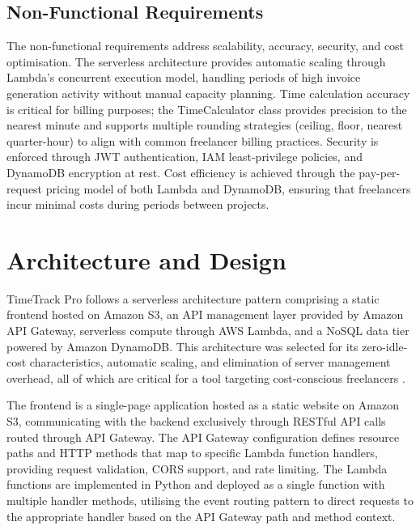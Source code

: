 \documentclass[conference]{IEEEtran}
\begin{document}
\subsection{Non-Functional Requirements}

The non-functional requirements address scalability, accuracy, security, and cost optimisation. The serverless architecture provides automatic scaling through Lambda's concurrent execution model, handling periods of high invoice generation activity without manual capacity planning. Time calculation accuracy is critical for billing purposes; the TimeCalculator class provides precision to the nearest minute and supports multiple rounding strategies (ceiling, floor, nearest quarter-hour) to align with common freelancer billing practices. Security is enforced through JWT authentication, IAM least-privilege policies, and DynamoDB encryption at rest. Cost efficiency is achieved through the pay-per-request pricing model of both Lambda and DynamoDB, ensuring that freelancers incur minimal costs during periods between projects.

\section{Architecture and Design}

TimeTrack Pro follows a serverless architecture pattern comprising a static frontend hosted on Amazon S3, an API management layer provided by Amazon API Gateway, serverless compute through AWS Lambda, and a NoSQL data tier powered by Amazon DynamoDB. This architecture was selected for its zero-idle-cost characteristics, automatic scaling, and elimination of server management overhead, all of which are critical for a tool targeting cost-conscious freelancers \cite{serverlesspatterns}.

The frontend is a single-page application hosted as a static website on Amazon S3, communicating with the backend exclusively through RESTful API calls routed through API Gateway. The API Gateway configuration defines resource paths and HTTP methods that map to specific Lambda function handlers, providing request validation, CORS support, and rate limiting. The Lambda functions are implemented in Python and deployed as a single function with multiple handler methods, utilising the event routing pattern to direct requests to the appropriate handler based on the API Gateway path and method context.
\end{document}
